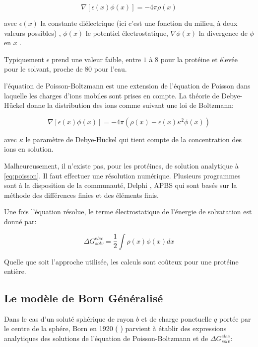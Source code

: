 \begin{equation}
  \label{eq:poisson}
  \nabla [ \epsilon(x) \phi(x)] = - 4 \pi \rho(x)   
\end{equation}

avec $\epsilon(x)$ la constante diélectrique (ici c'est une fonction du milieu, à deux valeurs possibles) , $\phi (x)$ le potentiel électrostatique, $\nabla \phi(x)$ la divergence de $\phi$ en $x$ .

Typiquement $\epsilon$ prend une valeur faible, entre $1$ à $8$ pour la protéine et élevée pour le solvant, proche de $80$ pour l'eau.

l'équation de Poisson-Boltzmann est une extension de l'équation de Poisson dans laquelle les charges d'ions mobiles sont prises en compte. La théorie de Debye-Hückel donne la distribution des ions comme suivant une loi de Boltzmann:

\begin{equation}
  \nabla [ \epsilon (x) \phi(x)] = -4 \pi ( \rho(x) - \epsilon(x) \kappa^2 \phi(x))
\end{equation}

avec $ \kappa $ le paramètre de Debye-Hückel qui tient compte de la concentration des ions en solution.


Malheureusement, il n'existe pas, pour les protéines, de solution analytique à \ref{eq:poisson}. Il faut effectuer une résolution numérique. Plusieurs programmes sont à la disposition de la communauté, Delphi \cite{Rocchia02}, APBS \cite{Baker01}  qui sont basés sur la méthode des différences finies et des éléments finis.

Une fois l'équation résolue, le terme électrostatique de l'énergie de solvatation est donné par:

\begin{equation}
\Delta G_{solv}^{elec} = \frac{1}{2} \int \rho(x)\phi(x)dx  
\end{equation}

Quelle que soit l'approche utilisée, les calculs sont coûteux pour une protéine entière.


\subsection{Le modèle de Born Généralisé}
\label{sub:GB}
Dans le cas d'un soluté sphérique de rayon $b$ et de charge ponctuelle $q$ portée par le centre de la sphére, Born en 1920 ( \cite{Born20}) parvient à établir des expressions analytiques des solutions de l'équation de Poisson-Boltzmann et de $ \Delta G_{solv}^{elec}$:


